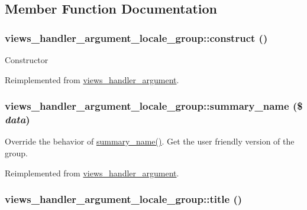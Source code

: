 \subsection{Member Function Documentation}
\hypertarget{classviews__handler__argument__locale__group_5dd96da33f67166727c6af6547ccbb7a}{
\subsubsection[{construct}]{\setlength{\rightskip}{0pt plus 5cm}views\_\-handler\_\-argument\_\-locale\_\-group::construct ()}}
\label{classviews__handler__argument__locale__group_5dd96da33f67166727c6af6547ccbb7a}


Constructor 

Reimplemented from \hyperlink{classviews__handler__argument_93594a31e95e1a14cead4f038d7b321b}{views\_\-handler\_\-argument}.\hypertarget{classviews__handler__argument__locale__group_effcc011f90a9269f7793e089b994f71}{
\subsubsection[{summary\_\-name}]{\setlength{\rightskip}{0pt plus 5cm}views\_\-handler\_\-argument\_\-locale\_\-group::summary\_\-name (\$ {\em data})}}
\label{classviews__handler__argument__locale__group_effcc011f90a9269f7793e089b994f71}


Override the behavior of \hyperlink{classviews__handler__argument__locale__group_effcc011f90a9269f7793e089b994f71}{summary\_\-name()}. Get the user friendly version of the group. 

Reimplemented from \hyperlink{classviews__handler__argument_4c55a340453eed4d35c69f7ac790cac1}{views\_\-handler\_\-argument}.\hypertarget{classviews__handler__argument__locale__group_5eb8e22e84904fa604f785484befe86a}{
\subsubsection[{title}]{\setlength{\rightskip}{0pt plus 5cm}views\_\-handler\_\-argument\_\-locale\_\-group::title ()}}
\label{classviews__handler__argument__locale__group_5eb8e22e84904fa604f785484befe86a}


